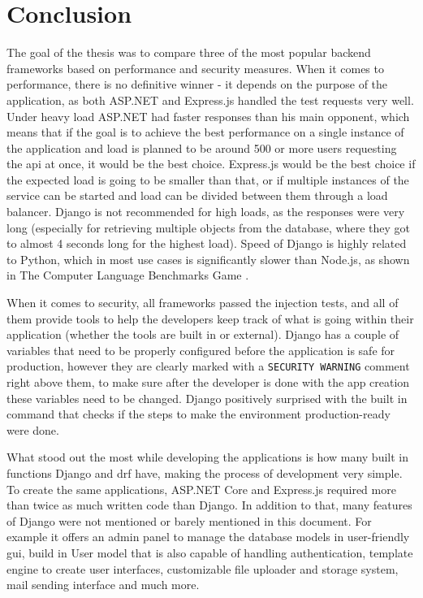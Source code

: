 
\chapter{Conclusion}

The goal of the thesis was to compare three of the most popular backend frameworks based on performance and security measures. When it comes to performance, there is no definitive winner - it depends on the purpose of the application, as both ASP.NET and Express.js handled the test requests very well. Under heavy load ASP.NET had faster responses than his main opponent, which means that if the goal is to achieve the best performance on a single instance of the application and load is planned to be around 500 or more users requesting the \acrshort{api} at once, it would be the best choice. Express.js would be the best choice if the expected load is going to be smaller than that, or if multiple instances of the service can be started and load can be divided between them through a load balancer. Django is not recommended for high loads, as the responses were very long (especially for retrieving multiple objects from the database, where they got to almost 4 seconds long for the highest load). Speed of Django is highly related to Python, which in most use cases is significantly slower than Node.js, as shown in The Computer Language Benchmarks Game \cite{benchmarksGame}.

When it comes to security, all frameworks passed the injection tests, and all of them provide tools to help the developers keep track of what is going within their application (whether the tools are built in or external). Django has a couple of variables that need to be properly configured before the application is safe for production, however they are clearly marked with a \lstinline{SECURITY WARNING} comment right above them, to make sure after the developer is done with the app creation these variables need to be changed. Django positively surprised with the built in command that checks if the steps to make the environment production-ready were done.

What stood out the most while developing the applications is how many built in functions Django and \acrshort{drf} have, making the process of development very simple. To create the same applications, ASP.NET Core and Express.js required more than twice as much written code than Django. In addition to that, many features of Django were not mentioned or barely mentioned in this document. For example it offers an admin panel to manage the database models in user-friendly \acrshort{gui}, build in User model that is also capable of handling authentication, template engine to create user interfaces, customizable file uploader and storage system, mail sending interface and much more.

